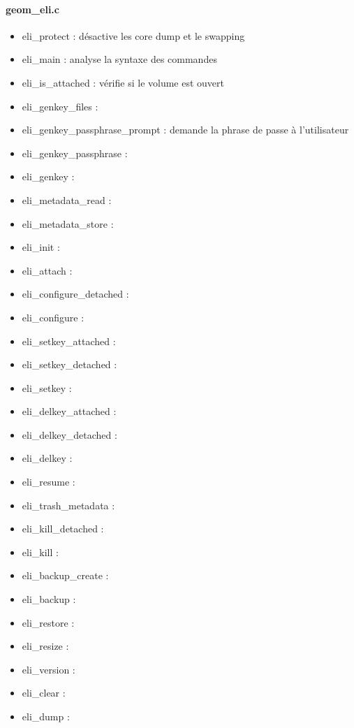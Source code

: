 \paragraph{geom\_eli.c}
\begin{itemize}
	\item eli\_protect : désactive les core dump et le swapping
	\item eli\_main : analyse la syntaxe des commandes
	\item eli\_is\_attached : vérifie si le volume est ouvert
	\item eli\_genkey\_files : 
	\item eli\_genkey\_passphrase\_prompt : demande la phrase de passe à
		l'utilisateur
	\item eli\_genkey\_passphrase :
	\item eli\_genkey :
	\item eli\_metadata\_read :
	\item eli\_metadata\_store :
	\item eli\_init :
	\item eli\_attach :
	\item eli\_configure\_detached :
	\item eli\_configure :
	\item eli\_setkey\_attached :
	\item eli\_setkey\_detached :
	\item eli\_setkey :
	\item eli\_delkey\_attached :
	\item eli\_delkey\_detached :
	\item eli\_delkey :
	\item eli\_resume :
	\item eli\_trash\_metadata :
	\item eli\_kill\_detached :
	\item eli\_kill :
	\item eli\_backup\_create :
	\item eli\_backup :
	\item eli\_restore :
	\item eli\_resize :
	\item eli\_version :
	\item eli\_clear :
	\item eli\_dump :
\end{itemize}

